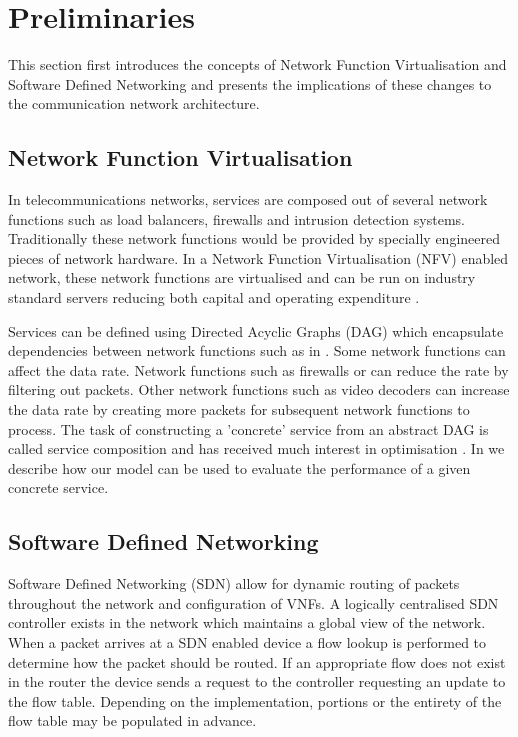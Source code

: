 
\section{Preliminaries}
\label{sec:preliminaries}
This section first introduces the concepts of Network Function Virtualisation and Software Defined Networking and presents the implications of these changes to the communication network architecture.

\subsection{Network Function Virtualisation}
In telecommunications networks, services are composed out of several network functions such as load balancers, firewalls and intrusion detection systems. Traditionally these network functions would be provided by specially engineered pieces of network hardware. In a Network Function Virtualisation (NFV) enabled network, these network functions are virtualised and can be run on industry standard servers reducing both capital and operating expenditure \cite{}.

Services can be defined using Directed Acyclic Graphs (DAG) which encapsulate dependencies between network functions such as in . Some network functions can affect the data rate. Network functions such as firewalls or can reduce the rate by filtering out packets. Other network functions such as video decoders can increase the data rate by creating more packets for subsequent network functions to process. The task of constructing a 'concrete' service from an abstract DAG is called service composition and has received much interest in optimisation \cite{EXAMPLES}. In  we describe how our model can be used to evaluate the performance of a given concrete service.

\subsection{Software Defined Networking}
Software Defined Networking (SDN) allow for dynamic routing of packets throughout the network \cite{} and configuration of VNFs. A logically centralised SDN controller exists in the network which maintains a global view of the network. When a packet arrives at a SDN enabled device a flow lookup is performed to determine how the packet should be routed. If an appropriate flow does not exist in the router the device sends a request to the controller requesting an update to the flow table. Depending on the implementation, portions or the entirety of the flow table may be populated in advance.

